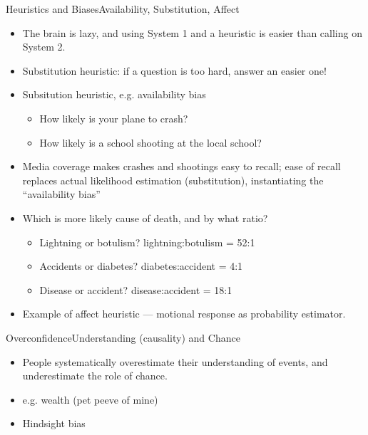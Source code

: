 \documentclass{beamer}
\begin{document}
\begin{frame}{Heuristics and Biases}{Availability, Substitution, Affect}
\begin{itemize}
\addtolength{\itemsep}{0.5\baselineskip}
\item The brain is lazy, and using System 1 and a heuristic is easier than calling on System 2.
\item Substitution heuristic: if a question is too hard, answer an easier one!
\item Subsitution heuristic, e.g. availability bias
    \begin{itemize}
    \addtolength{\itemsep}{0.5\baselineskip}
    \item How likely is your plane to crash?
    \item How likely is a school shooting at the local school?
    \end{itemize}
\item Media coverage makes crashes and shootings easy to recall; ease of recall replaces actual likelihood estimation (substitution), instantiating the ``availability bias'' 
\item Which is more likely cause of death, and by what ratio? 
    \begin{itemize}
    \addtolength{\itemsep}{0.5\baselineskip}
    \item Lightning or botulism? lightning:botulism = 52:1
    \item Accidents or diabetes? diabetes:accident = 4:1
    \item Disease or accident? disease:accident = 18:1
    \end{itemize}
\item Example of affect heuristic --- motional response as probability estimator.
\end{itemize}

\end{frame}

\begin{frame}{Overconfidence}{Understanding (causality) and Chance}
\begin{itemize}
\addtolength{\itemsep}{0.5\baselineskip}
\item People systematically overestimate their understanding of events, and underestimate the role of chance.
\item e.g. wealth (pet peeve of mine)
\item Hindsight bias
\end{itemize}

\end{frame}
\end{document}
